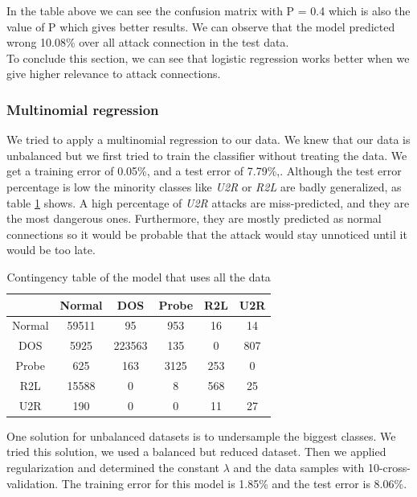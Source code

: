 \documentclass[a4paper]{article} %
\begin{document}
In the table above we can see the confusion matrix with P = 0.4 which is also the value of P which gives better results. We can observe that the model predicted wrong 10.08\% over all attack connection in the test data. \\
To conclude this section, we can see that logistic regression works better when we give higher relevance to attack connections.

\subsubsection{Multinomial regression}
We tried to apply a multinomial regression to our data. We knew that our data is unbalanced but we first tried to train the classifier without treating the data. We get a training error of 0.05\%, and a test error of 7.79\%,. Although the test error percentage is low the minority classes like \textit{U2R} or \textit{R2L} are badly generalized, as table \ref{table:unbModel} shows. A high percentage of \textit{U2R} attacks are miss-predicted, and they are the most dangerous ones. Furthermore, they are mostly predicted as normal connections so it would be probable that the attack would stay unnoticed until it would be too late. 

\begin{table}[H]
	\centering
	\begin{tabular}{c | c c c c c}
		& Normal & DOS & Probe & R2L & U2R \\
		\hline
		Normal	& 59511	& 95 	 & 953	 & 16 	& 14 \\
		DOS		& 5925	& 223563 & 135	 & 0  	& 807\\
		Probe	& 625	& 163	 & 3125	 & 253	& 0 \\
		R2L		& 15588	& 0		 & 8   & 568 	& 25\\
		U2R		& 190	& 0		 & 0    & 11 	& 27\\	
	\end{tabular}
	\caption{Contingency table of the model that uses all the data}
	\label{table:unbModel}
\end{table}


One solution for unbalanced datasets is to undersample the biggest classes. We tried this solution, we used a balanced but reduced dataset. Then we applied regularization and determined the constant $\lambda$ and the data samples with 10-cross-validation. The training error for this model is 1.85\% and the test error is 8.06\%.
\end{document}
